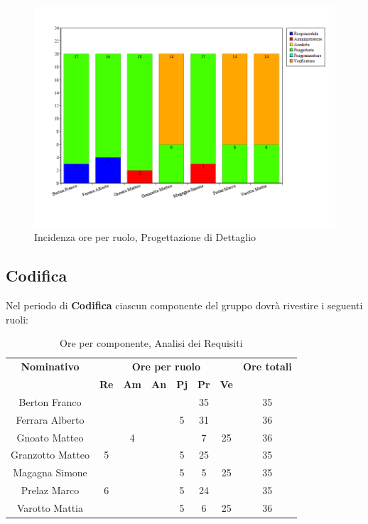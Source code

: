 \begin{figure}[H]
	\centering
	\includegraphics[scale=0.4]{immagini/Grafi/GrafoPD}
	\caption{Incidenza ore per ruolo, Progettazione di Dettaglio}
\end{figure}

\subsection{Codifica}
Nel periodo di \textbf{Codifica} ciascun componente del gruppo dovrà rivestire i seguenti ruoli:
\begin{table}[H]
	\begin{center}
		\begin{tabular}{|c|c|c|c|c|c|c|c|}
			\hline
			\textbf{Nominativo} & \multicolumn{6}{c|}{\textbf{Ore per ruolo}} & \textbf{Ore totali} \\
			& \textbf{Re} & \textbf{Am} & \textbf{An} & \textbf{Pj} & \textbf{Pr} & \textbf{Ve} & \\
			\hline
			Berton Franco		&		&		&		&		&	35	&		&	35	\\
			\hline	
			Ferrara Alberto		&		&		&		&	 5	&	31	&		& 	36	\\
			\hline		
			Gnoato Matteo		&		&	4	&		&		&	7	&	25	&	36	\\
			\hline						
			Granzotto Matteo	&	5	&	 	&		&	5	&	25 	& 		&	35	\\
			\hline
			Magagna Simone 		&		&		&		&	5	&	5	& 	25	&	35	\\
			\hline
			Prelaz Marco 		& 	6	&		&		&	5	&	24	&		&	35	\\
			\hline
			Varotto Mattia 		&		&		&		&	5	&	6	&	25	& 	36	\\
			\hline			
		\end{tabular}
	\end{center}
	\caption{Ore per componente, Analisi dei Requisiti}
\end{table}

